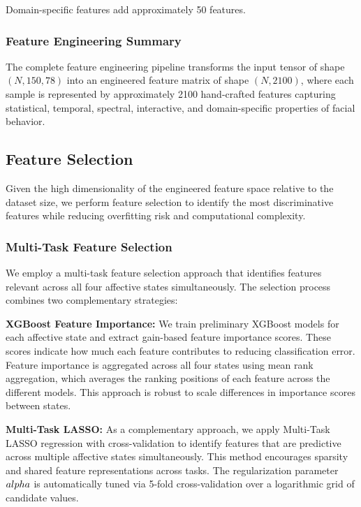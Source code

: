 \documentclass[11pt,a4paper]{article}
\begin{document}
Domain-specific features add approximately 50 features.

\subsubsection{Feature Engineering Summary}

The complete feature engineering pipeline transforms the input tensor of shape $(N, 150, 78)$ into an engineered feature matrix of shape $(N, 2100)$, where each sample is represented by approximately 2100 hand-crafted features capturing statistical, temporal, spectral, interactive, and domain-specific properties of facial behavior.

\subsection{Feature Selection}

Given the high dimensionality of the engineered feature space relative to the dataset size, we perform feature selection to identify the most discriminative features while reducing overfitting risk and computational complexity.

\subsubsection{Multi-Task Feature Selection}

We employ a multi-task feature selection approach that identifies features relevant across all four affective states simultaneously. The selection process combines two complementary strategies:

\textbf{XGBoost Feature Importance:} We train preliminary XGBoost models for each affective state and extract gain-based feature importance scores. These scores indicate how much each feature contributes to reducing classification error. Feature importance is aggregated across all four states using mean rank aggregation, which averages the ranking positions of each feature across the different models. This approach is robust to scale differences in importance scores between states.

\textbf{Multi-Task LASSO:} As a complementary approach, we apply Multi-Task LASSO regression with cross-validation to identify features that are predictive across multiple affective states simultaneously. This method encourages sparsity and shared feature representations across tasks. The regularization parameter $\\alpha$ is automatically tuned via 5-fold cross-validation over a logarithmic grid of candidate values.
\end{document}
